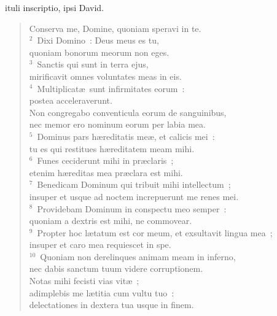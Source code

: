\bchapter
{}ituli inscriptio, ipsi David. \begin{flushleft}\begin{verse}\vspace{6pt}Conserva me, Domine, quoniam speravi in te.\\
${}^{2}$~Dixi Domino~: Deus meus es tu,\\ quoniam bonorum meorum non eges.\\
${}^{3}$~Sanctis qui sunt in terra ejus,\\ mirificavit omnes voluntates meas in eis.\\
${}^{4}$~Multiplicat\ae\ sunt infirmitates eorum~:\\ postea acceleraverunt.\\ Non congregabo conventicula eorum de sanguinibus,\\ nec memor ero nominum eorum per labia mea.\\
${}^{5}$~Dominus pars h\ae reditatis me\ae , et calicis mei~:\\ tu es qui restitues h\ae reditatem meam mihi.\\
${}^{6}$~Funes ceciderunt mihi in pr\ae claris~;\\ etenim h\ae reditas mea pr\ae clara est mihi.\\
${}^{7}$~Benedicam Dominum qui tribuit mihi intellectum~;\\ insuper et usque ad noctem increpuerunt me renes mei.\\
${}^{8}$~Providebam Dominum in conspectu meo semper~:\\ quoniam a dextris est mihi, ne commovear.\\
${}^{9}$~Propter hoc l\ae tatum est cor meum, et exsultavit lingua mea~;\\ insuper et caro mea requiescet in spe.\\
${}^{10}$~Quoniam non derelinques animam meam in inferno,\\ nec dabis sanctum tuum videre corruptionem.\\ Notas mihi fecisti vias vit\ae~;\\ adimplebis me l\ae titia cum vultu tuo~:\\ delectationes in dextera tua usque in finem.\end{verse}\end{flushleft}



